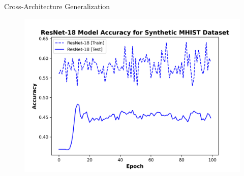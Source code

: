 \documentclass[final]{beamer}
\newlength{\colwidth}
\begin{document}
\begin{columns}
\begin{column}{\colwidth}
\begin{block}{Cross-Architecture Generalization}
\begin{figure}[ht]
\begin{minipage}{0.48\textwidth}
				\end{minipage}
				\hfill
				\begin{minipage}{0.48\textwidth}
					\centering
					\includegraphics[width=\textwidth]{../report/figures/mhist_resnet_acc.png}
					
				\end{minipage}
				
			\end{figure}
			
		\end{block}


\end{column}
\end{columns}
\end{document}
